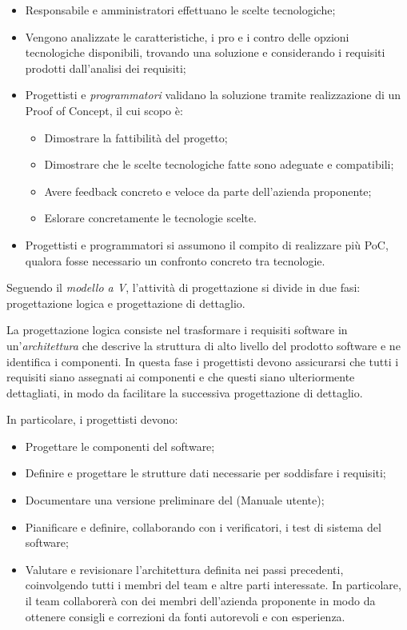 \documentclass[10pt, a4paper]{article}
\begin{document}
\begin{itemize}
    \item Responsabile e amministratori effettuano le scelte tecnologiche;
    \item Vengono analizzate le caratteristiche, i pro e i contro delle opzioni tecnologiche disponibili, trovando una soluzione e considerando i requisiti prodotti dall'analisi dei requisiti;
    \item Progettisti e \textit{programmatori\pg} validano la soluzione tramite realizzazione di un Proof of Concept, il cui scopo è:
    \begin{itemize}
        \item Dimostrare la fattibilità del progetto;
        \item Dimostrare che le scelte tecnologiche fatte sono adeguate e compatibili;
        \item Avere feedback concreto e veloce da parte dell'azienda proponente;
        \item Eslorare concretamente le tecnologie scelte.
    \end{itemize}
    \item Progettisti e programmatori si assumono il compito di realizzare più PoC, qualora fosse necessario un confronto concreto tra tecnologie.
\end{itemize}




Seguendo il \textit{modello a V}, l'attività di progettazione si divide in due fasi: progettazione logica e progettazione di dettaglio.

La progettazione logica consiste nel trasformare i requisiti software in un'\textit{architettura\pg} che descrive la struttura di alto livello del prodotto software e ne identifica i componenti.
In questa fase i progettisti devono assicurarsi che tutti i requisiti siano assegnati ai componenti e che questi siano ulteriormente dettagliati, in modo da facilitare la successiva progettazione di dettaglio.

In particolare, i progettisti devono:
\begin{itemize}
    \item Progettare le componenti del software;
    \item Definire e progettare le strutture dati necessarie per soddisfare i requisiti;
    \item Documentare una versione preliminare del (Manuale utente);
    \item Pianificare e definire, collaborando con i verificatori, i test di sistema del software;
    \item Valutare e revisionare l'architettura definita nei passi precedenti, coinvolgendo tutti i membri del team e altre parti interessate. In particolare, il team collaborerà con dei membri dell'azienda proponente in modo da ottenere consigli e correzioni da fonti autorevoli e con esperienza.
\end{itemize}
\end{document}
